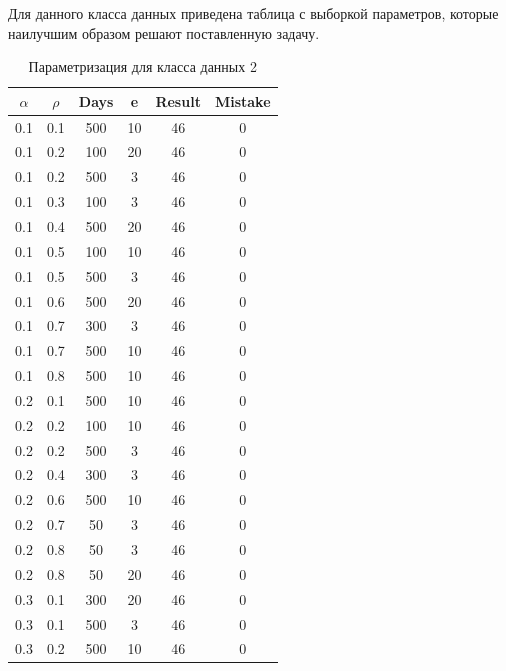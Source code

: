 Для данного класса данных приведена таблица с выборкой параметров, которые наилучшим образом решают поставленную задачу.

\begin{center}
    \captionsetup{justification=raggedright,singlelinecheck=off}
    \begin{longtable}[c]{|c|c|c|c|c|c|}
    \caption{Параметризация для класса данных 2\label{tbl:table_kd2}}\\ \hline
        $\alpha$ & $\rho$ & Days & e & Result & Mistake \\ \hline
        0.1 &  0.1 &  500 &   10 &    46 &     0 \\ \hline
        0.1 &  0.2 &  100 &   20 &    46 &     0 \\ \hline
        0.1 &  0.2 &  500 &    3 &    46 &     0 \\ \hline
        0.1 &  0.3 &  100 &    3 &    46 &     0 \\ \hline
        0.1 &  0.4 &  500 &   20 &    46 &     0 \\ \hline
        0.1 &  0.5 &  100 &   10 &    46 &     0 \\ \hline
        0.1 &  0.5 &  500 &    3 &    46 &     0 \\ \hline
        0.1 &  0.6 &  500 &   20 &    46 &     0 \\ \hline
        0.1 &  0.7 &  300 &    3 &    46 &     0 \\ \hline
        0.1 & 0.7 & 500 & 10 & 46 & 0 \\ \hline
        0.1 & 0.8 & 500 & 10 & 46 & 0 \\ \hline
        0.2 & 0.1 & 500 & 10 & 46 & 0 \\ \hline
        0.2 & 0.2 & 100 & 10 & 46 & 0 \\ \hline
        0.2 & 0.2 & 500 & 3 & 46 & 0 \\ \hline
        0.2 & 0.4 & 300 & 3 & 46 & 0 \\ \hline
        0.2 & 0.6 & 500 & 10 & 46 & 0 \\ \hline
        0.2 & 0.7 & 50 & 3 & 46 & 0 \\ \hline
        0.2 & 0.8 & 50 & 3 & 46 & 0 \\ \hline
        0.2 & 0.8 & 50 & 20 & 46 & 0 \\ \hline
        0.3 & 0.1 & 300 & 20 & 46 & 0 \\ \hline
        0.3 & 0.1 & 500 & 3 & 46 & 0 \\ \hline
        0.3 & 0.2 & 500 & 10 & 46 & 0 \\ \hline

\end{longtable}
\end{center}
